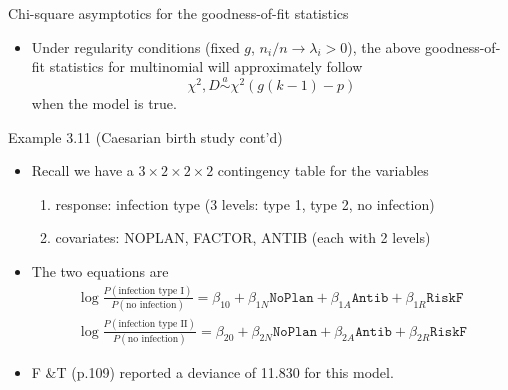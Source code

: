 \documentclass{beamer}
\begin{document}
\begin{frame} {Chi-square asymptotics for the goodness-of-fit statistics}

\begin{itemize}
\item
Under regularity conditions (fixed $g$, $n_i/n \rightarrow \lambda_i > 0$), the above goodness-of-fit statistics for multinomial will approximately follow
\[
\chi^2, D\stackrel{a}{\sim} \chi^2(g(k-1)-p)
\]
when the model is true. 
\end{itemize}


\end{frame}


\begin{frame} {Example 3.11 (Caesarian birth study cont'd)}
\begin{itemize}
\item Recall we have a $3 \times 2 \times 2 \times 2$ contingency table for the variables 
\begin{enumerate}
\item response: infection  type (3 levels: type 1, type 2, no infection)
\item covariates: NOPLAN, FACTOR, ANTIB (each with 2 levels)
\end{enumerate}
\item The two equations are 
\begin{eqnarray*}
\log\frac{P(\mbox{infection type I})}{P(\mbox{no infection})} 
=\beta_{10}+\beta_{1N}\texttt{NoPlan}+\beta_{1A}\texttt{Antib}+\beta_{1R}\texttt{RiskF} \\
\log\frac{P(\mbox{infection type II})}{P(\mbox{no infection})} 
=\beta_{20}+\beta_{2N}\texttt{NoPlan}+\beta_{2A}\texttt{Antib}+\beta_{2R}\texttt{RiskF}
\end{eqnarray*}

\item F \&T (p.109) reported a deviance of 11.830 for this model.


\end{itemize}
\end{frame}
\end{document}
